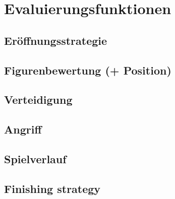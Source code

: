    



\section{Evaluierungsfunktionen}

\subsection{Eröffnungsstrategie}

\subsection{Figurenbewertung (+ Position)}

\subsection{Verteidigung}

\subsection{Angriff}

\subsection{Spielverlauf}

\subsection{Finishing strategy}
